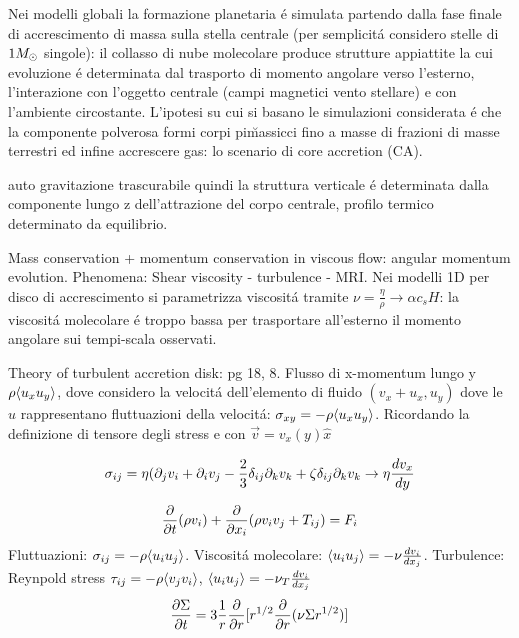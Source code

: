 \begin{workout}

\end{workout}


\begin{workout}
Nei modelli globali la formazione planetaria \'e simulata partendo dalla fase finale di accrescimento di massa sulla stella centrale (per semplicit\'a considero stelle di $1\msun{}$ singole): il collasso di nube molecolare produce strutture appiattite la cui evoluzione \'e determinata dal trasporto di momento angolare verso l'esterno, l'interazione con l'oggetto centrale (campi magnetici vento stellare) e con l'ambiente circostante.
L'ipotesi su cui si basano le simulazioni considerata \'e che la componente polverosa formi corpi pi\u massicci fino a masse di frazioni di masse terrestri  ed infine accrescere gas: lo scenario di core accretion (CA).
\end{workout}

\begin{workout}
auto gravitazione trascurabile quindi la struttura verticale \'e determinata dalla componente lungo z dell'attrazione del corpo centrale, profilo termico determinato da equilibrio.
\end{workout}

\begin{workout}
Mass conservation + momentum conservation in viscous flow: angular momentum evolution. Phenomena: Shear viscosity - turbulence - MRI.
Nei modelli 1D per disco di accrescimento si parametrizza viscosit\'a tramite $\nu=\frac{\eta}{\rho}\to\alpha c_s H$: la viscosit\'a molecolare \'e troppo bassa  per trasportare all'esterno il momento angolare sui tempi-scala osservati.

Theory of turbulent accretion disk: pg 18, 8.
Flusso di x-momentum lungo y $\rho\exv{u_xu_y}$, dove considero la velocit\'a dell'elemento di fluido $(v_x+u_x,u_y)$ dove le $u$ rappresentano fluttuazioni della velocit\'a: $\sigma_{xy}=-\rho\exv{u_xu_y}$.
Ricordando la definizione di tensore degli stress e con $\vec{v}=v_x(y)\hat{x}$

\begin{equation}
\sigma_{ij}=\eta(\partial_jv_i+\partial_iv_j-\frac{2}{3}\delta_{ij}\partial_kv_k+\zeta\delta_{ij}\partial_kv_k \to \eta\TDy{y}{v_x}
\end{equation}

\begin{equation}
\PDof{t}(\rho v_i)+\PDof{x_i}(\rho v_iv_j+T_{ij})=F_i
\end{equation}
Fluttuazioni: $\sigma_{ij}=-\rho\exv{u_iu_j}$.
Viscosit\'a molecolare: $\exv{u_iu_j}=-\nu\TDy{x_j}{v_i}$.
Turbulence: Reynpold stress $\tau_{ij}=-\rho\exv{v_jv_i}$, $\exv{u_iu_j}=-\nu_T\TDy{x_j}{v_i}$
\begin{equation}
\PDy{t}{\Sigma}=3\frac{1}{r}\PDof{r}[r\expy{1/2}\PDof{r}(\nu\Sigma r\expy{1/2})]\label{eq:sigmaevol}
\end{equation}
\end{workout}

